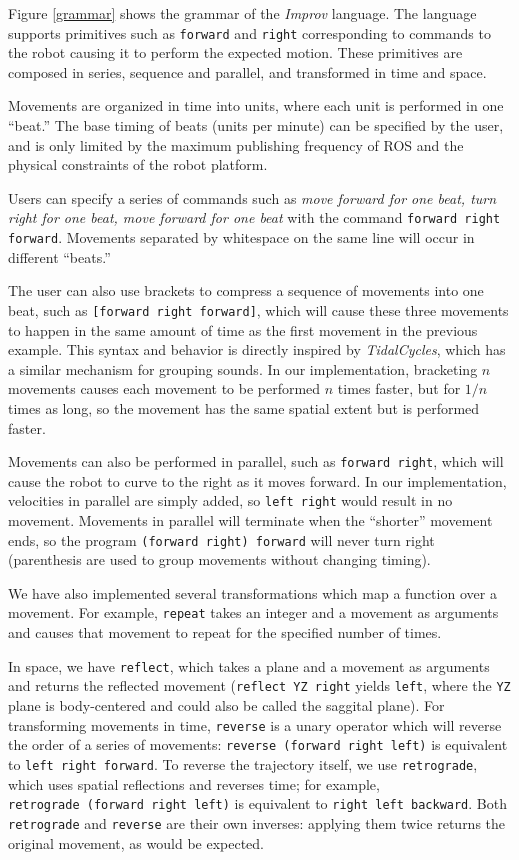 \documentclass[sigchi-a]{acmart}
\begin{document}
Figure \ref{grammar} shows the grammar of the \emph{Improv} language.
The language supports primitives such as \texttt{forward} and \texttt{right}
corresponding to commands to the robot causing it to perform the expected
motion. These primitives are composed in series, sequence and parallel, and
transformed in time and space.

Movements are organized in time into units, where each unit is performed in one
``beat.'' The base timing of beats (units per minute) can be specified by the
user, and is only limited by the maximum publishing frequency of ROS and the
physical constraints of the robot platform.

Users can specify a series of commands such as \emph{move forward for
one beat, turn right for one beat, move forward for one beat} with the
command \texttt{forward right forward}. Movements separated by whitespace 
on the same line will occur in different ``beats.''

The user can also use brackets to compress a sequence of movements into
one beat, such as \texttt{[forward right forward]}, which will
cause these three movements to happen in the same amount of time as the
first movement in the previous example. This syntax and behavior is directly 
inspired by \emph{TidalCycles}, which has a similar mechanism for grouping
sounds. In our implementation,
bracketing $n$ movements causes each movement to be performed $n$
times faster, but for $1/n$ times as long, so the movement has the
same spatial extent but is performed faster.

Movements can also be performed in parallel, such as
\texttt{forward \textbar{}\textbar{} right}, which will cause the
robot to curve to the right as it moves forward. In our implementation,
velocities in parallel are simply added, so
\texttt{left \textbar{}\textbar{} right} would result in no
movement. Movements in parallel will terminate
when the ``shorter'' movement ends, so the program
\texttt{(forward right) \textbar{}\textbar{} forward} will never turn
right (parenthesis are used to group movements without changing timing).

We have also implemented several transformations which map a function
over a movement. For example, \texttt{repeat} takes an integer and a
movement as arguments and causes that movement to repeat for the
specified number of times.

In space, we have \texttt{reflect}, which takes a plane and a movement
as arguments and returns the reflected movement
(\texttt{reflect\ YZ\ right} yields \texttt{left}, where the \texttt{YZ}
plane is body-centered and could also be called the saggital plane). For transforming movements in time, \texttt{reverse} is a
unary operator which will reverse the order of a series of movements:
\texttt{reverse\ (forward\ right\ left)} is equivalent to
\texttt{left\ right\ forward}. To reverse the trajectory itself, we use
\texttt{retrograde}, which uses spatial reflections and reverses time;
for example, \texttt{retrograde\ (forward\ right\ left)} is equivalent
to \texttt{right\ left\ backward}. Both \texttt{retrograde} and
\texttt{reverse} are their own inverses: applying them twice returns the
original movement, as would be expected.
\end{document}
